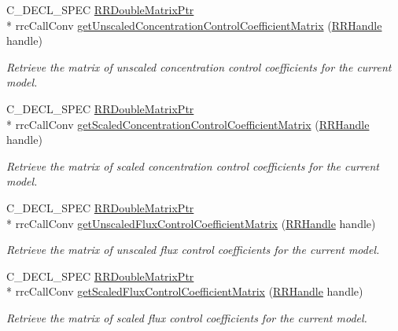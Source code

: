 \begin{DoxyCompactItemize}
C\-\_\-\-D\-E\-C\-L\-\_\-\-S\-P\-E\-C \hyperlink{rrc__types_8h_ae586a879d30f0823087e42d93464b5dd}{R\-R\-Double\-Matrix\-Ptr} \\*
rrc\-Call\-Conv \hyperlink{group__mca_ga98eca56a5da7035bcf55bce9fbed1e56}{get\-Unscaled\-Concentration\-Control\-Coefficient\-Matrix} (\hyperlink{rrc__types_8h_a1d68f0592372208fa5a5f2799ea4b3ae}{R\-R\-Handle} handle)
\begin{DoxyCompactList}\small\item\em Retrieve the matrix of unscaled concentration control coefficients for the current model. \end{DoxyCompactList}\item 
C\-\_\-\-D\-E\-C\-L\-\_\-\-S\-P\-E\-C \hyperlink{rrc__types_8h_ae586a879d30f0823087e42d93464b5dd}{R\-R\-Double\-Matrix\-Ptr} \\*
rrc\-Call\-Conv \hyperlink{group__mca_gaea6b9bb323f08262796f3c82a71b43c1}{get\-Scaled\-Concentration\-Control\-Coefficient\-Matrix} (\hyperlink{rrc__types_8h_a1d68f0592372208fa5a5f2799ea4b3ae}{R\-R\-Handle} handle)
\begin{DoxyCompactList}\small\item\em Retrieve the matrix of scaled concentration control coefficients for the current model. \end{DoxyCompactList}\item 
C\-\_\-\-D\-E\-C\-L\-\_\-\-S\-P\-E\-C \hyperlink{rrc__types_8h_ae586a879d30f0823087e42d93464b5dd}{R\-R\-Double\-Matrix\-Ptr} \\*
rrc\-Call\-Conv \hyperlink{group__mca_ga50d5f6aabac3cd1801c471845b191297}{get\-Unscaled\-Flux\-Control\-Coefficient\-Matrix} (\hyperlink{rrc__types_8h_a1d68f0592372208fa5a5f2799ea4b3ae}{R\-R\-Handle} handle)
\begin{DoxyCompactList}\small\item\em Retrieve the matrix of unscaled flux control coefficients for the current model. \end{DoxyCompactList}\item 
C\-\_\-\-D\-E\-C\-L\-\_\-\-S\-P\-E\-C \hyperlink{rrc__types_8h_ae586a879d30f0823087e42d93464b5dd}{R\-R\-Double\-Matrix\-Ptr} \\*
rrc\-Call\-Conv \hyperlink{group__mca_ga72cf127d1cc36b55786c2700fc53182b}{get\-Scaled\-Flux\-Control\-Coefficient\-Matrix} (\hyperlink{rrc__types_8h_a1d68f0592372208fa5a5f2799ea4b3ae}{R\-R\-Handle} handle)
\begin{DoxyCompactList}\small\item\em Retrieve the matrix of scaled flux control coefficients for the current model. \end{DoxyCompactList}\item 

\end{DoxyCompactItemize}
